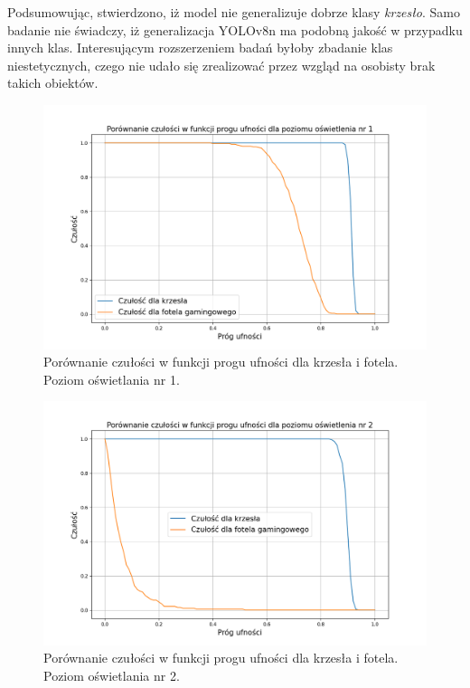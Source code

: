 Podsumowując, stwierdzono, iż model nie generalizuje dobrze klasy \emph{krzesło}. Samo badanie nie świadczy, iż generalizacja YOLOv8n ma podobną jakość w przypadku innych klas. Interesującym rozszerzeniem badań byłoby zbadanie klas niestetycznych, czego nie udało się zrealizować przez wzgląd na osobisty brak takich obiektów. 

\begin{figure}[H]
    \centering
    \includegraphics[width=\linewidth]{r_test_dokładności/chair_charts/1.png}
    \caption{Porównanie czułości w funkcji progu ufności dla krzesła i fotela. Poziom oświetlania nr 1.}
    \label{fig:chair-game-1}
\end{figure}

\begin{figure}[H]
    \centering
    \includegraphics[width=\linewidth]{r_test_dokładności/chair_charts/2.png}
    \caption{Porównanie czułości w funkcji progu ufności dla krzesła i fotela. Poziom oświetlania nr 2.}
    \label{fig:chair-game-2}
\end{figure}

